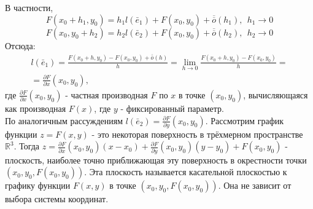 \documentclass[a4paper, 12pt]{article}
\theoremstyle{definition}
\begin{document}
	В частности, $$F(x_0 + h_1, y_0) = h_1l(\bar{e}_{1}) + F(x_0, y_0) + \overline{\overline{o}}(h_1), \ \ h_1 \rightarrow 0$$ $$F(x_0, y_0 + h_2) = h_2l(\bar{e}_{2}) + F(x_0, y_0) + \overline{\overline{o}}(h_2), \ \ h_2 \rightarrow 0$$
	Отсюда: \begin{align*}
		l(\bar{e}_{1}) = \frac{F(x_0 + h, y_0) - F(x_0, y_0) + \overline{\overline{o}}(h)}{h} = \lim\limits_{h \rightarrow 0} \frac{F(x_0 + h, y_0) - F(x_0, y_0)}{h} = \\ = \frac{\partial F}{\partial x}(x_0, y_0),
	\end{align*}
	где $\frac{\partial F}{\partial x}(x_0, y_0)$ - частная производная $F$ по $x$  в точке $(x_0, y_0)$, вычисляющаяся как производная $F(x)$, где $y$ - фиксированный параметр.\\
	По аналогичным рассуждениям $l(\bar{e}_{2}) = \frac{\partial F}{\partial y}(x_0, y_0)$.
	Рассмотрим график функции $z = F(x, y)$ - это некоторая поверхность в трёхмерном пространстве $\mathbb{R}^3$. Тогда $z = \frac{\partial F}{\partial x}(x_0, y_0)(x - x_0) + \frac{\partial F}{\partial y}(x_0, y_0)(y - y_0) + F(x_0, y_0)$ - плоскость, наиболее точно приближающая эту поверхность в окрестности точки $(x_0, y_0, F(x_0, y_0))$. Эта плоскость называется касательной плоскостью к графику функции $F(x, y)$ в точке $(x_0, y_0, F(x_0, y_0))$. Она не зависит от выбора системы координат.
\end{document}
